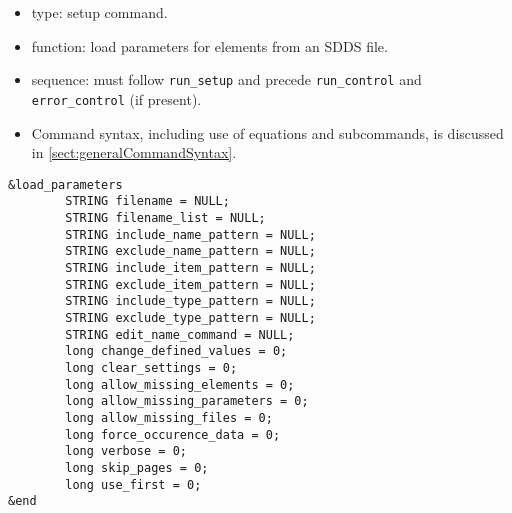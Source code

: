 \documentclass[11pt]{article}
\begin{document}
\begin{itemize}
\item type: setup command.
\item function: load parameters for elements from an SDDS file.
\item sequence: must follow \verb|run_setup| and precede \verb|run_control| and \verb|error_control| (if present).
\item Command syntax, including use of equations and subcommands, is discussed in \ref{sect:generalCommandSyntax}.
\end{itemize}

\begin{verbatim}
&load_parameters
        STRING filename = NULL;
        STRING filename_list = NULL;
        STRING include_name_pattern = NULL;
        STRING exclude_name_pattern = NULL;
        STRING include_item_pattern = NULL;
        STRING exclude_item_pattern = NULL;
        STRING include_type_pattern = NULL;
        STRING exclude_type_pattern = NULL;
        STRING edit_name_command = NULL;
        long change_defined_values = 0;
        long clear_settings = 0;
        long allow_missing_elements = 0;
        long allow_missing_parameters = 0;
        long allow_missing_files = 0;
        long force_occurence_data = 0;
        long verbose = 0;
        long skip_pages = 0;
        long use_first = 0;
&end
\end{verbatim}
\end{document}
